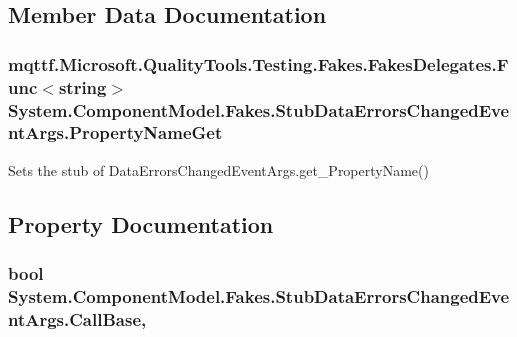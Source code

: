 \subsection{Member Data Documentation}
\hypertarget{class_system_1_1_component_model_1_1_fakes_1_1_stub_data_errors_changed_event_args_a7cff7c412c1c8588367399a891395403}{
\subsubsection[{Property\-Name\-Get}]{\setlength{\rightskip}{0pt plus 5cm}mqttf.\-Microsoft.\-Quality\-Tools.\-Testing.\-Fakes.\-Fakes\-Delegates.\-Func$<$string$>$ System.\-Component\-Model.\-Fakes.\-Stub\-Data\-Errors\-Changed\-Event\-Args.\-Property\-Name\-Get}}\label{class_system_1_1_component_model_1_1_fakes_1_1_stub_data_errors_changed_event_args_a7cff7c412c1c8588367399a891395403}


Sets the stub of Data\-Errors\-Changed\-Event\-Args.\-get\-\_\-\-Property\-Name()



\subsection{Property Documentation}
\hypertarget{class_system_1_1_component_model_1_1_fakes_1_1_stub_data_errors_changed_event_args_aa3da6da973b75920729bb4efd866942a}{
\subsubsection[{Call\-Base}]{\setlength{\rightskip}{0pt plus 5cm}bool System.\-Component\-Model.\-Fakes.\-Stub\-Data\-Errors\-Changed\-Event\-Args.\-Call\-Base\hspace{0.3cm}{\ttfamily [get]}, {\ttfamily [set]}}}\label{class_system_1_1_component_model_1_1_fakes_1_1_stub_data_errors_changed_event_args_aa3da6da973b75920729bb4efd866942a}


